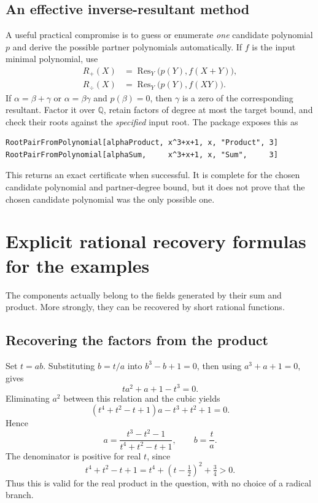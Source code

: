 \documentclass[11pt,a4paper]{article}
\newcommand{\Q}{\mathbb Q}
\newcommand{\Res}{\operatorname{Res}}
\theoremstyle{remark}\newtheorem{remark}[theorem]{Remark}
\begin{document}
\subsection{An effective inverse-resultant method}
A useful practical compromise is to guess or enumerate \emph{one} candidate polynomial $p$ and derive the possible partner polynomials automatically. If $f$ is the input minimal polynomial, use
\begin{align}
 R_+(X)&=\Res_Y\bigl(p(Y),f(X+Y)\bigr),\\
 R_\div(X)&=\Res_Y\bigl(p(Y),f(XY)\bigr).
 \label{eq:inverse}
\end{align}
If $\alpha=\beta+\gamma$ or $\alpha=\beta\gamma$ and $p(\beta)=0$, then $\gamma$ is a zero of the corresponding resultant. Factor it over $\Q$, retain factors of degree at most the target bound, and check their roots against the \emph{specified} input root. The package exposes this as
\begin{lstlisting}
RootPairFromPolynomial[alphaProduct, x^3+x+1, x, "Product", 3]
RootPairFromPolynomial[alphaSum,     x^3+x+1, x, "Sum",     3]
\end{lstlisting}
This returns an exact certificate when successful. It is complete for the chosen candidate polynomial and partner-degree bound, but it does not prove that the chosen candidate polynomial was the only possible one.

\section{Explicit rational recovery formulas for the examples}
\label{sec:recovery}
The components actually belong to the fields generated by their sum and product. More strongly, they can be recovered by short rational functions.

\subsection{Recovering the factors from the product}
Set $t=ab$. Substituting $b=t/a$ into $b^3-b+1=0$, then using $a^3+a+1=0$, gives
\[
 t a^2+a+1-t^3=0.
\]
Eliminating $a^2$ between this relation and the cubic yields
\[
 (t^4+t^2-t+1)a-t^3+t^2+1=0.
\]
Hence
\begin{equation}
 \boxed{a=\frac{t^3-t^2-1}{t^4+t^2-t+1},\qquad b=\frac{t}{a}.}
 \label{eq:recoverp}
\end{equation}
The denominator is positive for real $t$, since
\[
 t^4+t^2-t+1=t^4+(t-\tfrac12)^2+\tfrac34>0.
\]
Thus this is valid for the real product in the question, with no choice of a radical branch.
\end{document}

